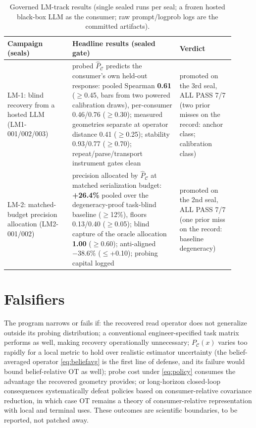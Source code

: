 \documentclass{article}
\theoremstyle{definition}
\theoremstyle{remark}
\newcommand{\PC}{P_{\mathcal{C}}}
\begin{document}
\begin{table}[t]
\caption{Governed LM-track results (single sealed runs per seal; a
frozen hosted black-box LLM as the consumer; raw prompt/logprob logs
are the committed artifacts).}
\label{tab:lm-evidence}
\centering
\begin{tabular}{@{}p{0.26\linewidth}p{0.43\linewidth}p{0.22\linewidth}@{}}
\toprule
\textbf{Campaign (seals)} & \textbf{Headline results (sealed gate)} & \textbf{Verdict} \\
\midrule
LM-1: blind recovery from a hosted LLM (LM1-001/002/003) &
probed $\widehat\PC$ predicts the consumer's own held-out response:
pooled Spearman \textbf{0.61} ($\ge$0.45, bars from two powered
calibration draws), per-consumer 0.46/0.76 ($\ge$0.30); measured
geometries separate at operator distance 0.41 ($\ge$0.25); stability
0.93/0.77 ($\ge$0.70); repeat/parse/transport instrument gates clean &
promoted on the 3rd seal, ALL PASS 7/7 (two prior misses on the
record: anchor class; calibration class) \\
\addlinespace
LM-2: matched-budget precision allocation (LM2-001/002) &
precision allocated by $\widehat\PC$ at matched serialization budget:
\textbf{+26.4\%} pooled over the degeneracy-proof task-blind baseline
($\ge$12\%), floors 0.13/0.40 ($\ge$0.05); blind capture of the oracle
allocation \textbf{1.00} ($\ge$0.60); anti-aligned $-38.6\%$
($\le$+0.10); probing capital logged & promoted on the 2nd seal, ALL
PASS 7/7 (one prior miss on the record: baseline degeneracy) \\
\bottomrule
\end{tabular}
\end{table}

\section{Falsifiers}
\label{sec:falsifiers}

The program narrows or fails if: the recovered read operator does not
generalize outside its probing distribution; a conventional
engineer-specified task matrix performs as well, making recovery
operationally unnecessary; $\PC(x)$ varies too rapidly for a local metric to
hold over realistic estimator uncertainty (the belief-averaged operator
\eqref{eq:beliefavg} is the first line of defense, and its failure would
bound belief-relative OT as well); probe cost under \eqref{eq:policy}
consumes the advantage the recovered geometry provides; or long-horizon
closed-loop consequences systematically defeat policies based on
consumer-relative covariance reduction, in which case OT remains a theory of
consumer-relative representation with local and terminal uses. These
outcomes are scientific boundaries, to be reported, not patched away.
\end{document}
